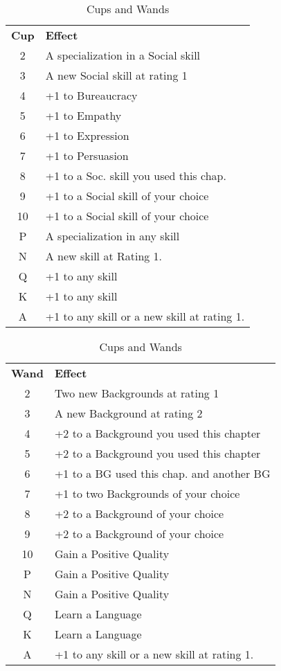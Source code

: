 \begin{table}[htb]
\caption{Cups and Wands}
\begin{minipage}{0.4\textwidth}
\begin{tabular}{c l}
\textbf{Cup} & \textbf{Effect}\\
2 & A specialization in a Social skill\\
3 & A new Social skill at rating 1\\
4 & +1 to Bureaucracy\\
5 & +1 to Empathy\\
6 & +1 to Expression\\
7 & +1 to Persuasion\\
8 & +1 to a Soc. skill you used this chap.\\
9 & +1 to a Social skill of your choice\\
10 & +1 to a Social skill of your choice\\
P & A specialization in any skill\\
N & A new skill at Rating 1.\\
Q & +1 to any skill\\
K & +1 to any skill\\
A & +1 to any skill or a new skill at rating 1.\\
\end{tabular}
\end{minipage}
\hspace{1.1cm}
\begin{minipage}{0.4\textwidth}
\begin{tabular}{c l}
\textbf{Wand} & \textbf{Effect}\\
2 & Two new Backgrounds at rating 1\\
3 & A new Background at rating 2\\
4 & +2 to a Background you used this chapter\\
5 & +2 to a Background you used this chapter\\
6 & +1 to a BG used this chap. and another BG\\
7 & +1 to two Backgrounds of your choice\\
8 & +2 to a Background of your choice\\
9 & +2 to a Background of your choice\\
10 & Gain a Positive Quality\\
P & Gain a Positive Quality\\
N & Gain a Positive Quality\\
Q & Learn a Language\\
K & Learn a Language\\
A & +1 to any skill or a new skill at rating 1.\\
\end{tabular}
\end{minipage}
\end{table}

